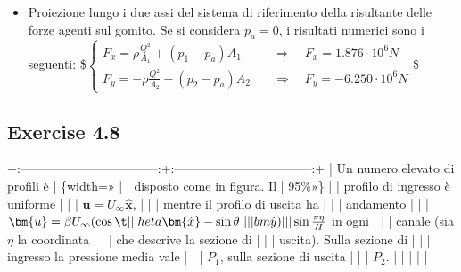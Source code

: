 \documentclass[letterpaper,10pt,italian]{jupyterBook}
\begin{document}
\begin{itemize}
\item {} 
\sphinxAtStartPar
Proiezione lungo i due assi del sistema di riferimento della
risultante delle forze agenti sul gomito. Se si considera \(p_a = 0\),
i risultati numerici sono i seguenti: \$\(\begin{cases}
    F_x = \rho \frac{Q^2}{A_1} + (p_1 - p_a)A_1  & \quad \Rightarrow \quad   F_x = 1.876 \cdot 10^6 N  \\
    F_y = -  \rho \frac{Q^2}{A_2} - (p_2 - p_a)A_2  & \quad \Rightarrow \quad   F_y =-6.250 \cdot 10^6 N
  \end{cases}\)\$

\end{itemize}

\sphinxstepscope


\subsection{Exercise 4.8}
\label{\detokenize{polimi/fluidmechanics-ita/template/capitoli/04_bilanci/0408in:exercise-4-8}}\label{\detokenize{polimi/fluidmechanics-ita/template/capitoli/04_bilanci/0408in:fluid-mechanics-balances-ex-08}}\label{\detokenize{polimi/fluidmechanics-ita/template/capitoli/04_bilanci/0408in::doc}}
\sphinxAtStartPar
+:———————————:+:———————————:+
| Un numero elevato di profili è    | \{width=» |
| disposto come in figura. Il       | 95\%»\}                             |
| profilo di ingresso è uniforme    |                                   |
| \(\bm{u} = U_\infty \bm{\hat{x}}\), |                                   |
| mentre il profilo di uscita ha    |                                   |
| andamento                         |                                   |
| \(\bm{u} = \beta U_\infty (\cos \t |                                   |
| heta \bm{\hat{x}} - \sin \theta \ |                                   |
| bm{\hat{y}})                      |                                   |
| \sin{\frac{\pi \eta}{H}}\) in ogni |                                   |
| canale (sia \(\eta\) la coordinata  |                                   |
| che descrive la sezione di        |                                   |
| uscita). Sulla sezione di         |                                   |
| ingresso la pressione media vale  |                                   |
| \(P_1\), sulla sezione di uscita    |                                   |
| \(P_2\).                            |                                   |
|                                   |                                   |
\end{document}
